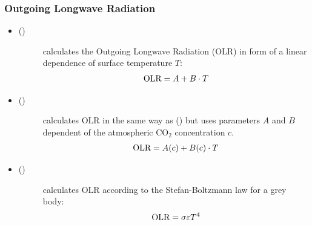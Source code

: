 \documentclass[a4paper,10pt,english]{sphinxmanual}
\begin{document}
\subsubsection{Outgoing Longwave Radiation}
\label{models:outgoing-longwave-radiation}\begin{itemize}
\item {} \begin{description}
\item[{{\hyperref[api/climlab.radiation:climlab.radiation.AplusBT.AplusBT]{\emph{}}} ()}] \leavevmode
calculates the Outgoing Longwave Radiation (\(\text{OLR}\)) in form of a linear dependence of surface temperature \(T\):
\begin{gather}
\begin{split}\text{OLR} = A+B \cdot T\end{split}\notag
\end{gather}
\end{description}

\item {} \begin{description}
\item[{{\hyperref[api/climlab.radiation:climlab.radiation.AplusBT.AplusBT_CO2]{\emph{}}} ()}] \leavevmode
calculates \(\text{OLR}\) in the same way as {\hyperref[api/climlab.radiation:climlab.radiation.AplusBT.AplusBT]{\emph{}}} () but uses parameters \(A\) and \(B\) dependent of the atmospheric \(\text{CO}_2\) concentration \(c\).
\begin{gather}
\begin{split}\text{OLR} = A(c)+B(c) \cdot T\end{split}\notag
\end{gather}
\end{description}

\item {} \begin{description}
\item[{{\hyperref[api/climlab.radiation:climlab.radiation.Boltzmann.Boltzmann]{\emph{}}} ()}] \leavevmode
calculates \(\text{OLR}\) according to the Stefan-Boltzmann law for a grey body:
\begin{gather}
\begin{split}\text{OLR} = \sigma \varepsilon T^4\end{split}\notag
\end{gather}
\end{description}

\end{itemize}
\end{document}
